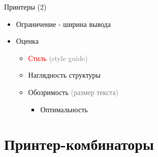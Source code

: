 \documentclass[sans]{beamer}
\begin{document}
\begin{frame}{Принтеры (2)}
  \begin{itemize}
    \item Ограничение - ширина вывода
    \item Оценка
      \begin{itemize}
        \item \textcolor{red}{Стиль} \textcolor{gray}{(style guide)}
        \item Наглядность структуры
        \item Обозримость \textcolor{gray}{(размер текста)}
          \begin{itemize}
            \item Оптимальность
          \end{itemize}
      \end{itemize}
  \end{itemize}
\end{frame}

\section{Принтер-комбинаторы}
\end{document}
